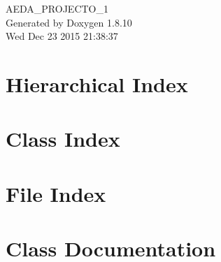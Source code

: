\documentclass[twoside]{book}
\newcommand{\+}{\discretionary{\mbox{\scriptsize$\hookleftarrow$}}{}{}}
\newcommand{\clearemptydoublepage}{%
  \newpage{\pagestyle{empty}\cleardoublepage}%
}
\begin{document}
\hypersetup{pageanchor=false,
             bookmarks=true,
             bookmarksnumbered=true,
             pdfencoding=unicode
            }
\begin{titlepage}
\vspace*{7cm}
\begin{center}%
{\Large A\+E\+D\+A\+\_\+\+P\+R\+O\+J\+E\+C\+T\+O\+\_\+1 }\\
\vspace*{1cm}
{\large Generated by Doxygen 1.8.10}\\
\vspace*{0.5cm}
{\small Wed Dec 23 2015 21:38:37}\\
\end{center}
\end{titlepage}
\clearemptydoublepage
\tableofcontents
\clearemptydoublepage
{}
\hypersetup{pageanchor=true}

\chapter{Hierarchical Index}

\chapter{Class Index}

\chapter{File Index}

\chapter{Class Documentation}































\end{document}
